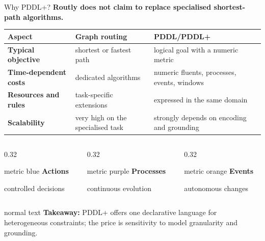 \documentclass[10pt,aspectratio=169]{beamer}
\newcommand{\takeaway}[1]{%
  \begin{beamercolorbox}[rounded=true,sep=0.65ex,wd=\linewidth]{normal text}%
    \textbf{Takeaway:} #1
  \end{beamercolorbox}%
}
\newcommand{\metric}[3]{%
  \begin{beamercolorbox}[rounded=true,sep=0.75ex,wd=\linewidth]{#1}%
    {\Large\bfseries #2}\par
    {\scriptsize #3}
  \end{beamercolorbox}%
}
\begin{document}
\begin{frame}{Why PDDL+?}
  \textbf{Routly does not claim to replace specialised shortest-path algorithms.}

  \vspace{0.18cm}
  \centering
  {\small
  \begin{tabularx}{0.92\linewidth}{@{}>{\bfseries}p{2.75cm}XX@{}}
    \toprule
    Aspect & Graph routing & PDDL/PDDL+ \\
    \midrule
    Typical objective & shortest or fastest path & logical goal with a numeric metric \\
    Time-dependent costs & dedicated algorithms & numeric fluents, processes, events, windows \\
    Resources and rules & task-specific extensions & expressed in the same domain \\
    Scalability & very high on the specialised task & strongly depends on encoding and grounding \\
    \bottomrule
  \end{tabularx}}

  \vspace{0.20cm}
  \begin{columns}[T,onlytextwidth]
    \begin{column}{0.32\textwidth}
      \metric{metric blue}{Actions}{controlled decisions}
    \end{column}
    \begin{column}{0.32\textwidth}
      \metric{metric purple}{Processes}{continuous evolution}
    \end{column}
    \begin{column}{0.32\textwidth}
      \metric{metric orange}{Events}{autonomous changes}
    \end{column}
  \end{columns}

  \vspace{0.18cm}
  \takeaway{PDDL+ offers one declarative language for heterogeneous constraints; the price is sensitivity to model granularity and grounding.}
\end{frame}
\end{document}
